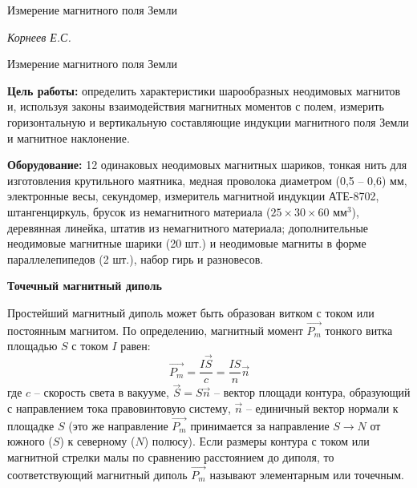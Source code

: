 \documentclass[14pt]{article}
\begin{document}
\begin{titlepage}
	\begin{center}
		\fontsize{18pt}{20pt}\selectfont
		
		\vspace*{5cm}
		\fontsize{24pt}{25pt}\selectfont
		Измерение магнитного поля Земли
	\end{center}
	\begin{flushright}
		\fontsize{18pt}{20pt}\selectfont
		\vspace{14cm}
		\hspace{-3cm}
		\textit{Корнеев Е.С.}
	\end{flushright}		
\end{titlepage}

\begin{center}
	\fontsize{16pt}{18pt}\selectfont	
	Измерение магнитного поля Земли
\end{center}


\fontsize{14pt}{16pt}\selectfont
\vspace{1cm}
\textbf{Цель работы:} определить характеристики шарообразных неодимовых магнитов и, используя законы взаимодействия магнитных моментов с полем, измерить горизонтальную и вертикальную составляющие индукции магнитного поля Земли и магнитное наклонение.

\vspace{0.5cm}
\textbf{Оборудование:} 12 одинаковых неодимовых магнитных шариков, тонкая нить для изготовления крутильного маятника, медная проволока диаметром (0,5 -- 0,6) мм, электронные весы, секундомер, измеритель магнитной индукции АТЕ-8702, штангенциркуль, брусок из немагнитного материала ($25\times30\times60$ мм$^3$), деревянная линейка, штатив из немагнитного материала; дополнительные неодимовые магнитные шарики (20 шт.) и неодимовые магниты в форме параллелепипедов (2 шт.), набор гирь и разновесов.

\vspace{1cm}
\textbf{Точечный магнитный диполь}

Простейший магнитный диполь может быть образован витком с током или постоянным магнитом. По определению, магнитный момент $\vec{P_m}$ тонкого витка площадью $S$ с током $I$ равен:
$$
	\vec{P_m} = \frac{I\vec{S}}{c} = \frac{IS}{n}\vec{n}
$$
где $c$ – скорость света в вакууме, $\vec{S} = S\vec{n}$ -- вектор площади контура, образующий с направлением тока правовинтовую систему, $\vec{n}$ -- единичный вектор нормали к площадке $S$ (это же направление $\vec{P_m}$ принимается за направление $S \rightarrow N$ от южного ($S$) к северному ($N$) полюсу). Если размеры контура с током или магнитной стрелки малы по сравнению расстоянием до диполя, то соответствующий магнитный диполь $\vec{P_m}$ называют элементарным или точечным. 
\end{document}
